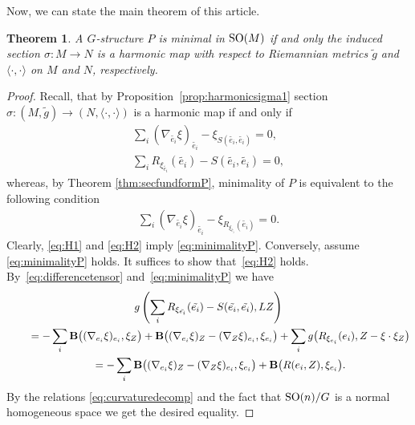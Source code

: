 \documentclass[10pt,a4paper]{amsart}
\numberwithin{equation}{section}
\newtheorem{Theorem}{Theorem}[section]
\newcommand{\skal}[2]{\langle #1,#2\rangle}
\begin{document}
Now, we can state the main theorem of this article.


\begin{Theorem}\label{thm:minimalityofP}
A $G$-structure $P$ is minimal in ${\rm SO}(M)$ if and only the induced section \mbox{$\sigma\colon M{\to} N$} is a harmonic map with respect to Riemannian metrics $\tilde{g}$ and $\skal{\cdot}{\cdot}$ on $M$ and $N$, respectively.
\end{Theorem}

\begin{proof}
Recall, that by Proposition~\ref{prop:harmonicsigma1} section $\sigma\colon (M,\tilde{g})\to (N,\skal{\cdot}{\cdot})$ is a harmonic map if and only if
\begin{gather}
\sum_i(\nabla_{\tilde{e_i}}\xi)_{\tilde{e_i}}-\xi_{S(\tilde{e_i},\tilde{e_i})}=0,\label{eq:H1}\\ %
\sum_i R_{\xi_{\tilde{e_i}}}(\tilde{e_i})-S(\tilde{e_i},\tilde{e_i})=0,\label{eq:H2} %
\end{gather}
whereas, by Theorem \ref{thm:secfundformP}, minimality of $P$ is equivalent to the following condition
\begin{gather}\label{eq:minimalityP}%
\sum_i (\nabla_{\tilde{e_i}}\xi)_{\tilde{e_i}}-\xi_{R_{\xi_{\tilde{e_i}}}(\tilde{e_i})}=0.
\end{gather}
Clearly, \eqref{eq:H1} and \eqref{eq:H2} imply \eqref{eq:minimalityP}. Conversely, assume \eqref{eq:minimalityP} holds. It suf\/f\/ices to show that~\eqref{eq:H2} holds. By~\eqref{eq:differencetensor} and~\eqref{eq:minimalityP} we have
\begin{gather*}
g\left( \sum_i R_{\xi_{\tilde{e_i}}}(\tilde{e_i})-S(\tilde{e_i},\tilde{e_i}),LZ\right)\\
\qquad{}=-\sum_i{\bf B}\big((\nabla_{e_i}\xi)_{e_i},\xi_Z\big)
+{\bf B}\big((\nabla_{e_i}\xi)_Z-(\nabla_Z\xi)_{e_i},\xi_{e_i}\big) +\sum_i g\big(R_{\xi_{e_i}}(e_i),Z-\xi\cdot \xi_Z\big)\\
\qquad{} =-\sum_i{\bf B}\big((\nabla_{e_i}\xi)_Z-(\nabla_Z\xi)_{e_i},\xi_{e_i}\big)+{\bf B}\big(R(e_i,Z),\xi_{e_i}\big).
\end{gather*}
By the relations \eqref{eq:curvaturedecomp} and the fact that ${\rm SO}(n)/G$ is a normal homogeneous space we get the desired equality.
\end{proof}
\end{document}
